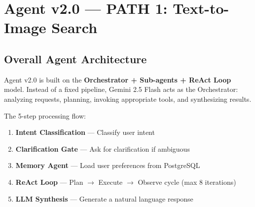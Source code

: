 \documentclass[12pt, twoside]{report}
\begin{document}
\chapter{Agent v2.0 --- PATH 1: Text-to-Image Search}

\section{Overall Agent Architecture}
Agent v2.0 is built on the \textbf{Orchestrator + Sub-agents + ReAct Loop} model. Instead of a fixed pipeline, Gemini 2.5 Flash acts as the Orchestrator: analyzing requests, planning, invoking appropriate tools, and synthesizing results.

The 5-step processing flow:
\begin{enumerate}
    \item \textbf{Intent Classification} --- Classify user intent
    \item \textbf{Clarification Gate} --- Ask for clarification if ambiguous
    \item \textbf{Memory Agent} --- Load user preferences from PostgreSQL
    \item \textbf{ReAct Loop} --- Plan $\rightarrow$ Execute $\rightarrow$ Observe cycle (max 8 iterations)
    \item \textbf{LLM Synthesis} --- Generate a natural language response
\end{enumerate}
\end{document}
